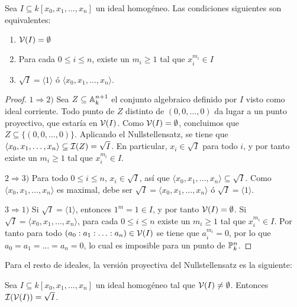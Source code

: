 \documentclass[ACGA.tex]{subfiles}
\begin{document}
\begin{prop}\label{idealirrelevante} Sea $I\subseteq k[x_0,x_1,\ldots,x_n]$ un ideal homogéneo. Las condiciones siguientes son equivalentes:
 \begin{enumerate}
  \item $\mathcal{V}(I)=\emptyset$
\item Para cada $0\leq i\leq n$, existe un $m_i\geq 1$ tal que $x_i^{m_i}\in I$
\item $\sqrt{I}=\langle 1\rangle$ ó $\langle x_0,x_1,\ldots,x_n\rangle$.
 \end{enumerate}

\end{prop}

\begin{proof}
$1\Rightarrow 2)$ Sea $Z\subseteq\mathbb{A}^{n+1}_k$ el conjunto algebraico definido por $I$ visto como ideal corriente. Todo punto de $Z$ distinto de $(0,0,\ldots,0)$ da lugar a un punto proyectivo, que estaría en $\mathcal{V}(I)$. Como $\mathcal{V}(I)=\emptyset$, concluimos que $Z\subseteq\{(0,0,\ldots,0)\}$. Aplicando el Nullstellensatz, se tiene que $\langle x_0,x_1,\ldots,x_n\rangle\subseteq\mathcal{I}(Z)=\sqrt{I}$. En particular, $x_i\in\sqrt{I}$ para todo $i$, y por tanto existe un $m_i\geq 1$ tal que $x_i^{m_i}\in I$.

$2\Rightarrow 3)$ Para todo $0\leq i\leq n$, $x_i\in \sqrt{I}$, así que $\langle x_0,x_1,\ldots,x_n\rangle\subseteq\sqrt{I}$. Como $\langle x_0,x_1,\ldots,x_n\rangle$ es maximal, debe ser $\sqrt{I}=\langle x_0,x_1,\ldots,x_n\rangle$ ó $\sqrt{I}=\langle 1\rangle$.

$3\Rightarrow 1)$ Si $\sqrt{I}=\langle 1\rangle$, entonces $1^m=1\in I$, y por tanto $\mathcal{V}(I)=\emptyset$. Si $\sqrt{I}=\langle x_0,x_1,\ldots,x_n\rangle$, para cada $0\leq i\leq n$ existe un $m_i\geq 1$ tal que $x_i^{m_i}\in I$. Por tanto para todo $(a_0:a_1:\ldots:a_n)\in\mathcal{V}(I)$ se tiene que $a_i^{m_i}=0$, por lo que $a_0=a_1=\ldots=a_n=0$, lo cual es imposible para un punto de $\mathbb{P}^n_k$.
\end{proof}

Para el resto de ideales, la versión proyectiva del Nullstellensatz es la siguiente:


\begin{teorema}
 Sea $I\subseteq k[x_0,x_1,\ldots,x_n]$ un ideal homogéneo tal que $\mathcal{V}(I)\neq\emptyset$. Entonces $\mathcal{I}(\mathcal{V}(I))=\sqrt{I}$.
\end{teorema}
\end{document}
